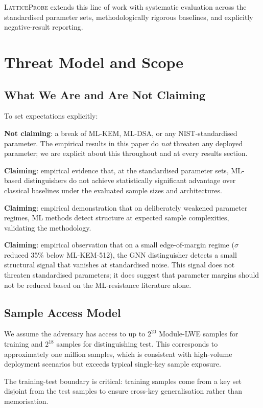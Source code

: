 \documentclass[sigconf,nonacm]{acmart}
\begin{document}
\textsc{LatticeProbe} extends this line of work with systematic
evaluation across the standardised parameter sets, methodologically
rigorous baselines, and explicitly negative-result reporting.

\section{Threat Model and Scope}

\subsection{What We Are and Are Not Claiming}

To set expectations explicitly:

\textbf{Not claiming}: a break of ML-KEM, ML-DSA, or any
NIST-standardised parameter. The empirical results in this paper
do \emph{not} threaten any deployed parameter; we are explicit
about this throughout and at every results section.

\textbf{Claiming}: empirical evidence that, at the standardised
parameter sets, ML-based distinguishers do not achieve
statistically significant advantage over classical baselines under
the evaluated sample sizes and architectures.

\textbf{Claiming}: empirical demonstration that on deliberately
weakened parameter regimes, ML methods detect structure at
expected sample complexities, validating the methodology.

\textbf{Claiming}: empirical observation that on a small
edge-of-margin regime ($\sigma$ reduced 35\% below ML-KEM-512), the
GNN distinguisher detects a small structural signal that vanishes
at standardised noise. This signal does not threaten standardised
parameters; it does suggest that parameter margins should not be
reduced based on the ML-resistance literature alone.

\subsection{Sample Access Model}

We assume the adversary has access to up to $2^{20}$ Module-LWE
samples for training and $2^{18}$ samples for distinguishing test.
This corresponds to approximately one million samples, which is
consistent with high-volume deployment scenarios but exceeds typical
single-key sample exposure.

The training-test boundary is critical: training samples come from a
key set disjoint from the test samples to ensure cross-key
generalisation rather than memorisation.
\end{document}
